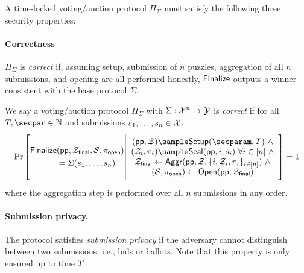 A time-locked voting/auction protocol $\Pi_\Sigma$ must satisfy the following three security properties:

\paragraph{Correctness} 
$\Pi_\Sigma$ is \emph{correct} if, assuming setup, submission of $n$ puzzles, aggregation of all $n$ submissions, and opening are all performed honestly, $\sf Finalize$ outputs a winner consistent with the base protocol $\Sigma$.

\begin{definition}[Correctness]\label{def:correctness_cicada}
We say a voting/auction protocol $\Pi_\Sigma$ with $\Sigma: \mathcal{X}^n \to \mathcal{Y}$ is \emph{correct} if for all $\Ttime,\secpar \in \mathbb{N}$ and submissions $s_1, \dots, s_n \in \mathcal{X}$,
\[
    \Pr\left[
        \begin{aligned}
            &\\
            \Finalize &(\pparam, \Z_{\sf final}, \mathcal{S}, \pi_{\sf open}) \\
            &= \Sigma(s_1, \dots, s_n)\\
            &\\
        \end{aligned}
        \middle|
        \begin{array}{c}
            (\pparam, \Z) \sample \Setup(\secparam, \Ttime)~\land\\
            (\Z_i, \pi_i) \sample \Seal(\pparam, i, s_i)~\forall i \in [n]~\land\\
            \Z_{\sf final} \gets \Aggr(\pparam, \Z, \{i, \Z_i, \pi_i\}_{i \in [n]})~\land\\
            (\mathcal{S}, \pi_{\sf open}) \gets \Open(\pparam, \Z_{\sf final}) \\
        \end{array}
    \right] = 1
\]
where the aggregation step is performed over all $n$ submissions in any order.
\end{definition}

\paragraph{Submission privacy.} 
The protocol satisfies \emph{submission privacy} if the adversary cannot distinguish between two submissions, i.e., bids or ballots. Note that this property is only ensured up to time $T$.

